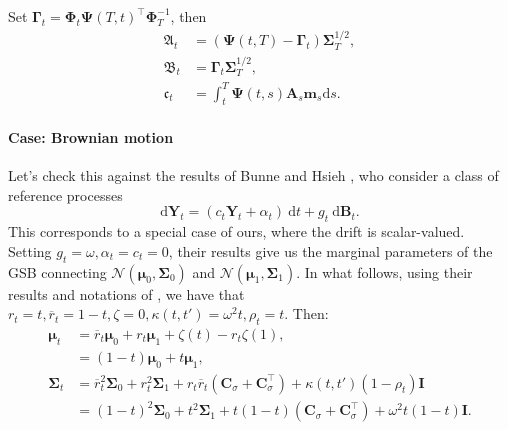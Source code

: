 \documentclass{article}
\newcommand{\diff}{\mathrm{d}}
\newcommand{\Id}{\mathbf{I}}
\newcommand{\Nc}{\mathcal{N}}
\newcommand{\bmathfrak}[1]{\bm{\mathfrak{#1}}}
\theoremstyle{newstyle}
\begin{document}
Set $\bm{\Gamma}_t = \bm{\Phi}_t \bm{\Psi}(T, t)^\top \bm{\Phi}_T^{-1}$, then
\begin{align}
  \bmathfrak{A}_t &= \left( \bm{\Psi}(t, T) - \bm{\Gamma}_t \right) \bm{\Sigma}_T^{1/2}, \\
  \bmathfrak{B}_t &= \bm{\Gamma}_t \bm{\Sigma}_T^{1/2}, \\
  \bmathfrak{c}_t &= \int_t^T \bm{\Psi}(t, s) \bm{A}_s \bm{m}_s \diff s.
\end{align}
 
\paragraph{Case: Brownian motion}
Let's check this against the results of Bunne and Hsieh \cite{bunne2023schrodinger}, who consider a class of reference processes
\[
  \diff \bm{Y}_t = (c_t \bm{Y}_t + \alpha_t) \: \diff t + g_t \: \diff \bm{B}_t. 
\]
This corresponds to a special case of ours, where the drift is scalar-valued. Setting $g_t = \omega, \alpha_t = c_t = 0$, their results give us the marginal parameters of the GSB connecting $\Nc(\bm{\mu}_0, \bm{\Sigma}_0)$ and $\Nc(\bm{\mu}_1, \bm{\Sigma}_1)$. In what follows, using their results and notations of \cite[Table 1]{bunne2023schrodinger}, we have that $r_t = t, \overline{r}_t = 1-t, \zeta = 0, \kappa(t, t') = \omega^2 t, \rho_t = t$. Then:
\begin{align}
  \bm{\mu}_t &= \overline{r}_t \bm{\mu}_0 + r_t \bm{\mu}_1 + \zeta(t) - r_t \zeta(1), \\
        &= (1-t) \bm{\mu}_0 + t \bm{\mu}_1, \\
  \bm{\Sigma}_t &= \overline{r}_t^2 \bm{\Sigma}_0 + r_t^2 \bm{\Sigma}_1 + r_t \overline{r}_t (\bm{C}_\sigma + \bm{C}_\sigma^\top) + \kappa(t, t') (1 - \rho_t) \Id  \\
        &= (1-t)^2 \bm{\Sigma}_0 + t^2 \bm{\Sigma}_1 + t(1-t) (\bm{C}_\sigma + \bm{C}_\sigma^\top) + \omega^2 t (1 - t) \Id. 
\end{align}
\end{document}
